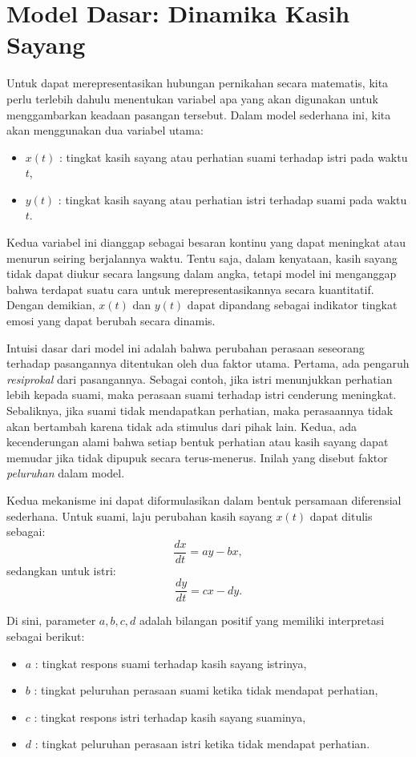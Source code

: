 \documentclass{bukumjh}
\begin{document}
\section{Model Dasar: Dinamika Kasih Sayang}

Untuk dapat merepresentasikan hubungan pernikahan secara matematis, kita perlu terlebih dahulu menentukan variabel apa yang akan digunakan untuk menggambarkan keadaan pasangan tersebut. 
Dalam model sederhana ini, kita akan menggunakan dua variabel utama: 
\begin{itemize}
  \item $x(t)$ : tingkat kasih sayang atau perhatian suami terhadap istri pada waktu $t$,
  \item $y(t)$ : tingkat kasih sayang atau perhatian istri terhadap suami pada waktu $t$.
\end{itemize}

Kedua variabel ini dianggap sebagai besaran kontinu yang dapat meningkat atau menurun seiring berjalannya waktu. 
Tentu saja, dalam kenyataan, kasih sayang tidak dapat diukur secara langsung dalam angka, tetapi model ini menganggap bahwa terdapat suatu cara untuk merepresentasikannya secara kuantitatif. 
Dengan demikian, $x(t)$ dan $y(t)$ dapat dipandang sebagai indikator tingkat emosi yang dapat berubah secara dinamis.

Intuisi dasar dari model ini adalah bahwa perubahan perasaan seseorang terhadap pasangannya ditentukan oleh dua faktor utama. 
Pertama, ada pengaruh \emph{resiprokal} dari pasangannya. 
Sebagai contoh, jika istri menunjukkan perhatian lebih kepada suami, maka perasaan suami terhadap istri cenderung meningkat. 
Sebaliknya, jika suami tidak mendapatkan perhatian, maka perasaannya tidak akan bertambah karena tidak ada stimulus dari pihak lain. 
Kedua, ada kecenderungan alami bahwa setiap bentuk perhatian atau kasih sayang dapat memudar jika tidak dipupuk secara terus-menerus. 
Inilah yang disebut faktor \emph{peluruhan} dalam model.

Kedua mekanisme ini dapat diformulasikan dalam bentuk persamaan diferensial sederhana. 
Untuk suami, laju perubahan kasih sayang $x(t)$ dapat ditulis sebagai:
\begin{equation}
\frac{dx}{dt} = a y - b x,
\end{equation}
sedangkan untuk istri:
\begin{equation}
\frac{dy}{dt} = c x - d y.
\end{equation}

Di sini, parameter $a, b, c, d$ adalah bilangan positif yang memiliki interpretasi sebagai berikut:
\begin{itemize}
  \item $a$ : tingkat respons suami terhadap kasih sayang istrinya,
  \item $b$ : tingkat peluruhan perasaan suami ketika tidak mendapat perhatian,
  \item $c$ : tingkat respons istri terhadap kasih sayang suaminya,
  \item $d$ : tingkat peluruhan perasaan istri ketika tidak mendapat perhatian.
\end{itemize}
\end{document}
